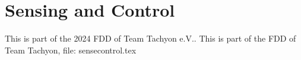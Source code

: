 \section{Sensing and Control}

This is part of the 2024 FDD of Team Tachyon e.V..
This is part of the FDD of Team Tachyon, file: sensecontrol.tex

